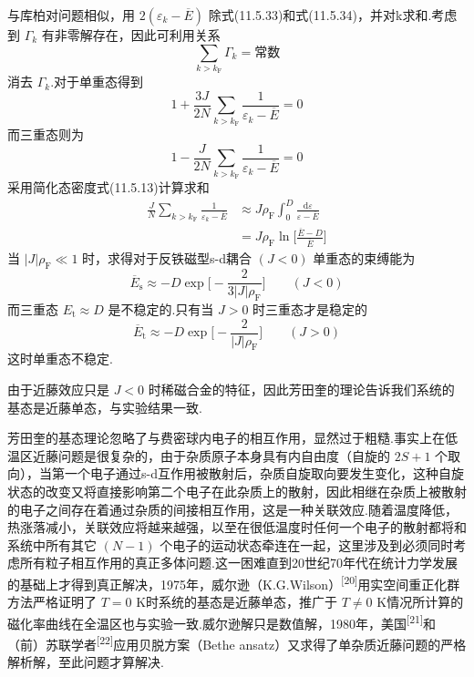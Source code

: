 与库柏对问题相似，用 $2(\varepsilon_{k}-\overline{E})$ 除式(11.5.33)和式(11.5.34)，并对k求和.考虑到 $\Gamma_{k}$ 有非零解存在，因此可利用关系
\begin{equation}
  \sum_{k>k_{\mathrm{F}}}\Gamma_{k}=\text{常数}
\end{equation}
消去 $\Gamma_{k}$.对于单重态得到
\begin{equation}
  1+\frac{3J}{2N}\sum_{k>k_{\mathrm{F}}}
  \frac{1}{\varepsilon_{k}-\overline{E}}=0
\end{equation}
而三重态则为
\begin{equation}
  1-\frac{J}{2N}\sum_{k>k_{\mathrm{F}}}
  \frac{1}{\varepsilon_{k}-\overline{E}}=0
\end{equation}
采用简化态密度式(11.5.13)计算求和
\begin{equation}
\begin{aligned}
  \frac{J}{N}\sum_{k>k_{\mathrm{F}}}\frac{1}{\varepsilon_{k}-\overline{E}}
  &\approx J\rho_{\mathrm{F}}\int_{0}^{D}
  \frac{\mathrm{d}\varepsilon}{\varepsilon-\overline{E}}\\
  &=J\rho_{\mathrm{F}}\ln\biggl[\frac{\overline{E}-D}{\overline{E}}\biggr]
\end{aligned}
\end{equation}
当 $|J|\rho_{\mathrm{F}}\ll1$ 时，求得对于反铁磁型s-d耦合 $(J<0)$ 单重态的束缚能为
\begin{equation}
  \overline{E}_{\mathrm{s}}\approx
  -D\exp\biggl[-\frac{2}{3|J|\rho_{\mathrm{F}}}\biggr]
  \qquad(J<0)
\end{equation}
而三重态 $E_{\mathrm{t}}\approx D$ 是不稳定的.只有当 $J>0$ 时三重态才是稳定的
\begin{equation}
  \overline{E}_{\mathrm{t}}\approx
  -D\exp\biggl[-\frac{2}{|J|\rho_{\mathrm{F}}}\biggr]
  \qquad(J>0)
\end{equation}
这时单重态不稳定.

由于近藤效应只是 $J<0$ 时稀磁合金的特征，因此芳田奎的理论告诉我们系统的基态是近藤单态，与实验结果一致.

芳田奎的基态理论忽略了与费密球内电子的相互作用，显然过于粗糙.事实上在低温区近藤问题是很复杂的，由于杂质原子本身具有内自由度（自旋的 $2S+1$ 个取向），当第一个电子通过s-d互作用被散射后，杂质自旋取向要发生变化，这种自旋状态的改变又将直接影响第二个电子在此杂质上的散射，因此相继在杂质上被散射的电子之间存在着通过杂质的间接相互作用，这是一种关联效应.随着温度降低，热涨落减小，关联效应将越来越强，以至在很低温度时任何一个电子的散射都将和系统中所有其它 $(N-1)$ 个电子的运动状态牵连在一起，这里涉及到必须同时考虑所有粒子相互作用的真正多体问题.这一困难直到20世纪70年代在统计力学发展的基础上才得到真正解决，1975年，威尔逊（K.G.Wilson）\textsuperscript{[20]}用实空间重正化群方法严格证明了 $T=0$ K时系统的基态是近藤单态，推广于 $T\neq0$ K情况所计算的磁化率曲线在全温区也与实验一致.威尔逊解只是数值解，1980年，美国\textsuperscript{[21]}和（前）苏联学者\textsuperscript{[22]}应用贝脱方案（Bethe ansatz）又求得了单杂质近藤问题的严格解析解，至此问题才算解决.

